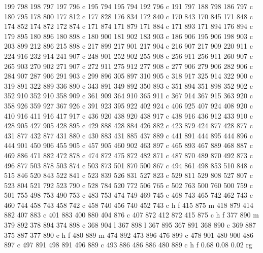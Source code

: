 {{        199 798 198 797 197 796 c
        195 794 195 794 192 796 c
        191 797 188 798 186 797 c
        180 795 178 800 177 812 c
        177 828 176 834 172 840 c
        170 843 170 845 171 848 c
        174 852 174 872 172 874 c
        171 874 171 879 171 884 c
        171 893 171 894 176 894 c
        179 895 180 896 180 898 c
        180 900 181 902 183 903 c
        186 906 195 906 198 903 c
        203 899 212 896 215 898 c
        217 899 217 901 217 904 c
        216 907 217 909 220 911 c
        224 916 232 914 241 907 c
        248 901 252 902 255 908 c
        256 911 256 911 260 907 c
        265 903 270 902 271 907 c
        272 911 275 912 277 908 c
        277 906 279 906 282 906 c
        284 907 287 906 291 903 c
        299 896 305 897 310 905 c
        318 917 325 914 322 900 c
        319 891 322 889 336 890 c
        343 891 349 892 350 893 c
        351 894 351 898 352 902 c
        352 910 352 910 358 909 c
        361 909 364 910 365 911 c
        367 914 367 915 363 920 c
        358 926 359 927 367 926 c
        391 923 395 922 402 924 c
        406 925 407 924 408 920 c
        410 916 411 916 417 917 c
        436 920 438 920 438 917 c
        438 916 436 912 433 910 c
        428 905 427 905 428 895 c
        429 888 428 884 426 882 c
        423 879 424 877 428 877 c
        431 877 432 877 431 880 c
        430 883 431 885 437 889 c
        441 891 444 895 444 896 c
        444 901 450 906 455 905 c
        457 905 460 902 463 897 c
        465 893 467 889 468 887 c
        469 886 471 882 472 878 c
        474 872 475 872 482 871 c
        487 870 489 870 492 873 c
        496 877 503 878 503 874 c
        503 873 501 870 500 867 c
        494 861 498 853 510 848 c
        515 846 520 843 522 841 c
        523 839 526 831 527 823 c
        529 811 529 808 527 807 c
        523 804 521 792 523 790 c
        528 784 520 772 506 765 c
        502 763 500 760 500 759 c
        501 755 498 753 490 753 c
        483 753 474 749 469 745 c
        468 743 465 742 462 743 c
        460 744 458 743 458 742 c
        458 740 456 740 452 743 c
        h f
        415 875 m
        418 879 414 882 407 883 c
        401 883 400 880 404 876 c
        407 872 412 872 415 875 c
        h f
        377 890 m
        379 892 378 894 374 898 c
        368 904 l
        367 898 l
        367 895 367 891 368 890 c
        369 887 375 887 377 890 c
        h f
        480 889 m
        474 892 473 896 476 899 c
        478 901 480 900 486 897 c
        497 891 498 891 496 889 c
        493 886 486 886 480 889 c
        h f
        0.68 0.08 0.02 rg
}}
